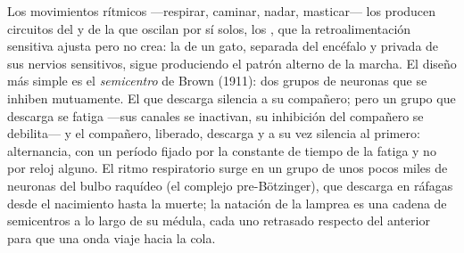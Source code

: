 \begin{proposition}\label{prop:b3:nervous-systems:cpg}
Los movimientos rítmicos ---respirar, caminar, nadar, masticar--- los
producen circuitos del  y de la  que
oscilan por sí solos, los \emph{}, que
la retroalimentación sensitiva ajusta pero no crea: la 
de un gato, separada del encéfalo y privada de sus nervios sensitivos,
sigue produciendo el patrón alterno de la marcha. El diseño más simple
es el \emph{semicentro} de Brown (1911): dos grupos de neuronas que se
inhiben mutuamente. El que descarga silencia a su compañero; pero un
grupo que descarga se fatiga ---sus canales se inactivan, su inhibición
del compañero se debilita--- y el compañero, liberado, descarga y a su
vez silencia al primero: alternancia, con un período fijado por la
constante de tiempo de la fatiga y no por reloj alguno. El ritmo
respiratorio surge en un grupo de unos pocos miles de neuronas del
bulbo raquídeo (el complejo pre-Bötzinger), que descarga en ráfagas
desde el nacimiento hasta la muerte; la natación de la lamprea es una
cadena de semicentros a lo largo de su médula, cada uno retrasado
respecto del anterior para que una onda viaje hacia la cola.
\end{proposition}

